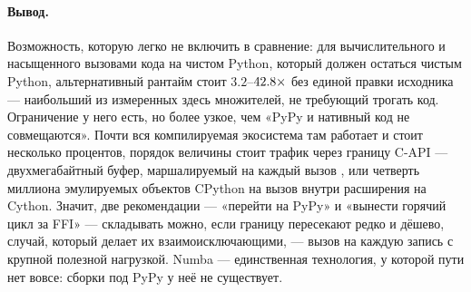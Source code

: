 \paragraph{Вывод.} Возможность, которую легко не включить в сравнение: для вычислительного и
насыщенного вызовами кода на чистом Python, который должен остаться чистым Python, альтернативный
рантайм стоит $3.2$--$\meas{ratio:b1_compute-314:matmul/cpython_loop|b1_compute-pypy311:matmul/cpython_loop}{42.8}\times$ без единой правки исходника --- наибольший из измеренных здесь
множителей, не требующий трогать код. Ограничение у него есть, но более узкое, чем «PyPy и нативный
код не совмещаются». Почти
вся компилируемая экосистема там работает и стоит несколько процентов, порядок величины стоит
трафик через границу C-API --- двухмегабайтный буфер, маршалируемый на каждый вызов ,
или четверть миллиона эмулируемых объектов CPython на вызов внутри расширения на Cython. Значит, две
рекомендации --- «перейти на PyPy» и «вынести горячий цикл за FFI» --- складывать можно, если
границу пересекают редко и дёшево, случай, который делает их взаимоисключающими, --- вызов на
каждую запись с крупной полезной нагрузкой. Numba --- единственная технология, у которой пути нет
вовсе: сборки под PyPy у неё не существует.
